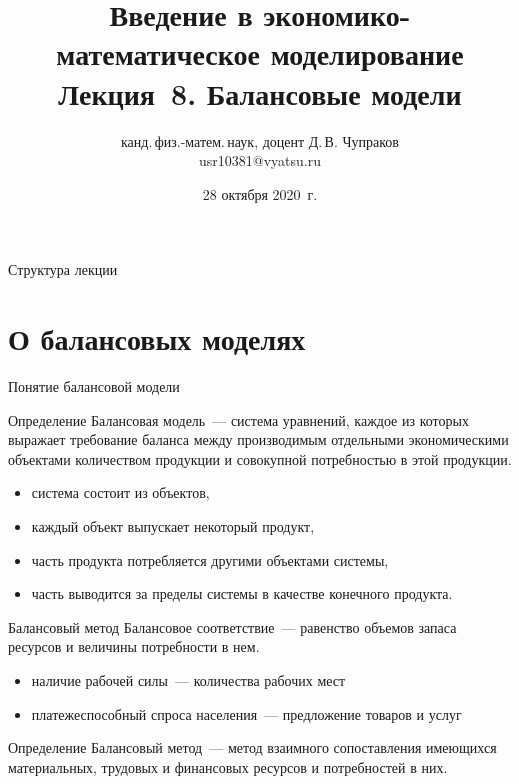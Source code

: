 \documentclass[unicode,11pt,notheorems,xcolor=table]{beamer}
\author[Д.\,В. Чупраков]{канд.\,физ.-матем.\,наук, доцент Д.\,В. Чупраков\\[6pt] usr10381@vyatsu.ru}
\institute[ВятГУ]{ФГБОУ ВО Вятский государственный университет}
\title[Лекция~8. Балансовые модели]{
	Введение в экономико-математическое моделирование\\[12pt]
	Лекция~8. Балансовые модели}
\date{28 октября 2020~г.}
\begin{document}
\maketitle

\begin{frame}{Структура лекции}
	\tableofcontents
\end{frame}



\section{О балансовых моделях}
\begin{frame}{Понятие балансовой модели}{}
	\begin{block}{Определение}
		\alert{Балансовая модель}~--- система уравнений, каждое из которых выражает требование баланса между производимым отдельными экономическими объектами количеством продукции и совокупной потребностью в этой продукции. 	
	\end{block}
    

	\begin{itemize}
		\item  
		система состоит из объектов,
		\item  
		каждый объект выпускает некоторый продукт, 
		\item 
		часть продукта потребляется другими объектами системы, 
		\item 
		часть выводится за пределы системы в качестве конечного продукта. 
	\end{itemize}
\end{frame}

\begin{frame}{Балансовый метод}
    \alert{Балансовое соответствие}~--- равенство объемов запаса ресурсов и величины потребности в нем.

	\begin{itemize}
		\item наличие рабочей силы~--- количества рабочих мест
		\item платежеспособный спроса населения~--- предложение товаров и услуг
	\end{itemize}
	\begin{block}{Определение}
		\alert{Балансовый метод}~--- метод взаимного сопоставления имеющихся материальных, трудовых и финансовых ресурсов и потребностей в них.
	\end{block}

\end{frame}
\end{document}

